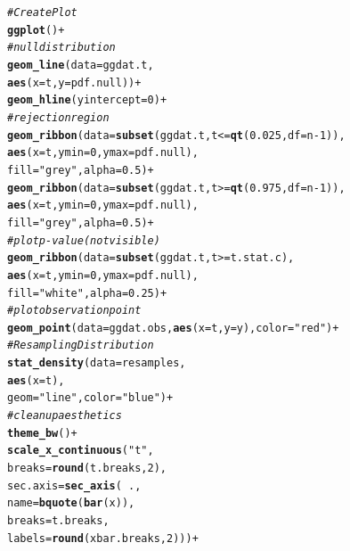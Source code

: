 \documentclass{article}\usepackage[]{graphicx}\usepackage[]{xcolor}
\makeatletter
\newcommand{\hlnum}[1]{\textcolor[rgb]{0.686,0.059,0.569}{#1}}%
\newcommand{\hlsng}[1]{\textcolor[rgb]{0.192,0.494,0.8}{#1}}%
\newcommand{\hlcom}[1]{\textcolor[rgb]{0.678,0.584,0.686}{\textit{#1}}}%
\newcommand{\hlopt}[1]{\textcolor[rgb]{0,0,0}{#1}}%
\newcommand{\hldef}[1]{\textcolor[rgb]{0.345,0.345,0.345}{#1}}%
\newcommand{\hlkwc}[1]{\textcolor[rgb]{0.333,0.667,0.333}{#1}}%
\newcommand{\hlkwd}[1]{\textcolor[rgb]{0.737,0.353,0.396}{\textbf{#1}}}%
\newenvironment{kframe}{%
 \def\at@end@of@kframe{}%
 \ifinner\ifhmode%
  \def\at@end@of@kframe{\end{minipage}}%
  \begin{minipage}{\columnwidth}%
 \fi\fi%
 \def\FrameCommand##1{\hskip\@totalleftmargin \hskip-\fboxsep
 \colorbox{shadecolor}{##1}\hskip-\fboxsep
     \hskip-\linewidth \hskip-\@totalleftmargin \hskip\columnwidth}%
 \MakeFramed {\advance\hsize-\width
   \@totalleftmargin\z@ \linewidth\hsize
   \@setminipage}}%
 {\par\unskip\endMakeFramed%
 \at@end@of@kframe}
\newenvironment{knitrout}{}{} %
\makeatother
\begin{document}
\begin{enumerate}
\begin{enumerate}
\begin{knitrout}
\begin{kframe}
\begin{alltt}
\hlcom{# Create Plot}
\hlkwd{ggplot}\hldef{()} \hlopt{+}
  \hlcom{# null distribution}
  \hlkwd{geom_line}\hldef{(}\hlkwc{data}\hldef{=ggdat.t,}
            \hlkwd{aes}\hldef{(}\hlkwc{x}\hldef{=t,} \hlkwc{y}\hldef{=pdf.null))}\hlopt{+}
  \hlkwd{geom_hline}\hldef{(}\hlkwc{yintercept}\hldef{=}\hlnum{0}\hldef{)}\hlopt{+}
  \hlcom{# rejection region}
  \hlkwd{geom_ribbon}\hldef{(}\hlkwc{data}\hldef{=}\hlkwd{subset}\hldef{(ggdat.t, t}\hlopt{<=}\hlkwd{qt}\hldef{(}\hlnum{0.025}\hldef{,} \hlkwc{df}\hldef{=n}\hlopt{-}\hlnum{1}\hldef{)),}
              \hlkwd{aes}\hldef{(}\hlkwc{x}\hldef{=t,} \hlkwc{ymin}\hldef{=}\hlnum{0}\hldef{,} \hlkwc{ymax}\hldef{=pdf.null),}
              \hlkwc{fill}\hldef{=}\hlsng{"grey"}\hldef{,} \hlkwc{alpha}\hldef{=}\hlnum{0.5}\hldef{)}\hlopt{+}
  \hlkwd{geom_ribbon}\hldef{(}\hlkwc{data}\hldef{=}\hlkwd{subset}\hldef{(ggdat.t, t}\hlopt{>=}\hlkwd{qt}\hldef{(}\hlnum{0.975}\hldef{,} \hlkwc{df}\hldef{=n}\hlopt{-}\hlnum{1}\hldef{)),}
              \hlkwd{aes}\hldef{(}\hlkwc{x}\hldef{=t,} \hlkwc{ymin}\hldef{=}\hlnum{0}\hldef{,} \hlkwc{ymax}\hldef{=pdf.null),}
              \hlkwc{fill}\hldef{=}\hlsng{"grey"}\hldef{,} \hlkwc{alpha}\hldef{=}\hlnum{0.5}\hldef{)}\hlopt{+}
  \hlcom{# plot p-value (not visible)}
  \hlkwd{geom_ribbon}\hldef{(}\hlkwc{data}\hldef{=}\hlkwd{subset}\hldef{(ggdat.t, t}\hlopt{>=}\hldef{t.stat.c),}
              \hlkwd{aes}\hldef{(}\hlkwc{x}\hldef{=t,} \hlkwc{ymin}\hldef{=}\hlnum{0}\hldef{,} \hlkwc{ymax}\hldef{=pdf.null),}
              \hlkwc{fill}\hldef{=}\hlsng{"white"}\hldef{,} \hlkwc{alpha}\hldef{=}\hlnum{0.25}\hldef{)}\hlopt{+}
  \hlcom{# plot observation point}
  \hlkwd{geom_point}\hldef{(}\hlkwc{data}\hldef{=ggdat.obs,} \hlkwd{aes}\hldef{(}\hlkwc{x}\hldef{=t,} \hlkwc{y}\hldef{=y),} \hlkwc{color}\hldef{=}\hlsng{"red"}\hldef{)}\hlopt{+}
  \hlcom{# Resampling Distribution}
  \hlkwd{stat_density}\hldef{(}\hlkwc{data}\hldef{=resamples,}
               \hlkwd{aes}\hldef{(}\hlkwc{x}\hldef{=t),}
               \hlkwc{geom}\hldef{=}\hlsng{"line"}\hldef{,} \hlkwc{color}\hldef{=}\hlsng{"blue"}\hldef{)}\hlopt{+}
  \hlcom{# clean up aesthetics}
  \hlkwd{theme_bw}\hldef{()}\hlopt{+}
  \hlkwd{scale_x_continuous}\hldef{(}\hlsng{"t"}\hldef{,}
                     \hlkwc{breaks} \hldef{=} \hlkwd{round}\hldef{(t.breaks,}\hlnum{2}\hldef{),}
                     \hlkwc{sec.axis} \hldef{=} \hlkwd{sec_axis}\hldef{(}\hlopt{~}\hldef{.,}
                                         \hlkwc{name} \hldef{=} \hlkwd{bquote}\hldef{(}\hlkwd{bar}\hldef{(x)),}
                                         \hlkwc{breaks} \hldef{= t.breaks,}
                                         \hlkwc{labels} \hldef{=} \hlkwd{round}\hldef{(xbar.breaks,}\hlnum{2}\hldef{)))} \hlopt{+}

\end{alltt}
\end{kframe}
\end{knitrout}
\end{enumerate}
\end{enumerate}
\end{document}
